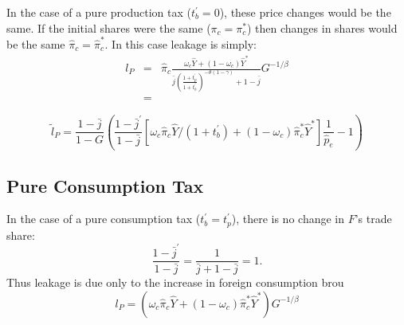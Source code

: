 \documentclass[notitlepage,12pt]{article}
\begin{document}
In the case of a pure production tax ($t_{b}^{\prime }=0$), these price
changes would be the same. If the initial shares were the same ($\pi
_{c}=\pi _{c}^{\ast }$) then changes in shares would be the same $\hat{\pi}%
_{c}=\hat{\pi}_{c}^{\ast }$. In this case leakage is simply:%
\begin{eqnarray*}
l_{P} &=&\hat{\pi}_{c}\frac{\omega _{c}\hat{Y}+\left( 1-\omega _{c}\right) 
\hat{Y}^{\ast }}{\bar{j}\left( \frac{1+t_{p}^{\prime }}{1+t_{b}^{\prime }}%
\right) ^{-\theta \left( 1-\gamma \right) }+1-\bar{j}}G^{-1/\beta } \\
&=&
\end{eqnarray*}

\begin{equation*}
\tilde{l}_{P}=\frac{1-\bar{j}}{1-G}\left( \frac{1-\bar{j}^{\prime }}{1-\bar{j%
}}\left[ \omega _{c}\hat{\pi}_{c}\hat{Y}/\left( 1+t_{b}^{\prime }\right)
+\left( 1-\omega _{c}\right) \hat{\pi}_{c}^{\ast }\hat{Y}^{\ast }\right] 
\frac{1}{\hat{p}_{e}}-1\right) 
\end{equation*}

\subsection{Pure Consumption Tax}

In the case of a pure consumption tax ($t_{b}^{\prime }=t_{p}^{\prime }$),
there is no change in $F$'s trade share:%
\begin{equation*}
\frac{1-\bar{j}^{\prime }}{1-\bar{j}}=\frac{1}{\bar{j}+1-\bar{j}}=1.
\end{equation*}%
Thus leakage is due only to the increase in foreign consumption brou%
\begin{equation*}
l_{P}=\left( \omega _{c}\hat{\pi}_{c}\hat{Y}+\left( 1-\omega _{c}\right) 
\hat{\pi}_{c}^{\ast }\hat{Y}^{\ast }\right) G^{-1/\beta }
\end{equation*}
\end{document}
